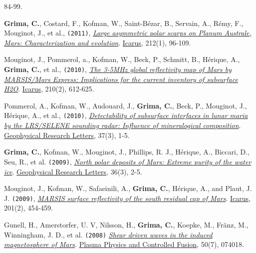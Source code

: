 \begin{etaremune}
  84-99.
\item
  \textbf{Grima, C.}, Costard, F., Kofman, W., Saint-Bézar, B., Servain,
  A., Rémy, F., Mouginot, J., et al., \texttt{(2011)},
  \href{http://www.sciencedirect.com/science/article/pii/S0019103510004859}{\emph{Large
  asymmetric polar scarps on Planum Australe, Mars: Characterization and
  evolution}}. \ul{Icarus}, 212(1), 96-109.
\item
  Mouginot, J., Pommerol, a., Kofman, W., Beck, P., Schmitt, B.,
  Hérique, A., \textbf{Grima, C.}, et al., \texttt{(2010)},
  \href{https://www.google.com/url?sa=t\&rct=j\&q=\&esrc=s\&source=web\&cd=1\&cad=rja\&ved=0CDAQFjAA\&url=http\%3A\%2F\%2Fess.uci.edu\%2Fresearchgrp\%2Ferignot\%2Ffiles\%2Fmouginot_icarus_2010.pdf\&ei=j6inUdytH5HA9QSNx4FQ\&usg=AFQjCNHiVV4-tjSgM28QWYY64vKaSa2U4Q\&sig2=fGYDJTm_cOpv0rwZIGDX6A\&bvm=bv.47244034,d.eWU}{
  \emph{The 3-5MHz global reflectivity map of Mars by MARSIS/Mars
  Express: Implications for the current inventory of subsurface H2O}}.
  \ul{Icarus}, 210(2), 612-625.
\item
  Pommerol, A., Kofman, W., Audouard, J., \textbf{Grima, C.}, Beck, P.,
  Mouginot, J., Hérique, A., et al., \texttt{(2010)},
  \href{http://onlinelibrary.wiley.com/doi/10.1029/2009GL041681/abstract}{\emph{Detectability
  of subsurface interfaces in lunar maria by the LRS/SELENE sounding
  radar: Influence of mineralogical composition}}. \ul{Geophysical Research
  Letters}, 37(3), 1-5.
\item
  \textbf{Grima, C.}, Kofman, W., Mouginot, J., Phillips, R. J.,
  Hérique, A., Biccari, D., Seu, R., et al. \texttt{(2009)},
  \href{http://onlinelibrary.wiley.com/doi/10.1029/2008GL036326/abstract}{\emph{North
  polar deposits of Mars: Extreme purity of the water ice}}. \ul{Geophysical
  Research Letters}, 36(3), 2-5.
\item
  Mouginot, J., Kofman, W., Safaeinili, A., \textbf{Grima, C.}, Hérique,
  A., and Plaut, J. J. \texttt{(2009)},
  \href{http://www.sciencedirect.com/science/article/pii/S0019103509000311}{
  \emph{MARSIS surface reflectivity of the south residual cap of Mars}}.
  \ul{Icarus}, 201(2), 454-459.
\item
  Gunell, H., Amerstorfer, U. V, Nilsson, H., \textbf{Grima, C.},
  Koepke, M., Fränz, M., Winningham, J. D., et al. \texttt{(2008)}
  \href{http://iopscience.iop.org/0741-3335/50/7/074018}{\emph{Shear
  driven waves in the induced magnetosphere of Mars}}. \ul{Plasma Physics
  and Controlled Fusion}, 50(7), 074018.
\end{etaremune}
